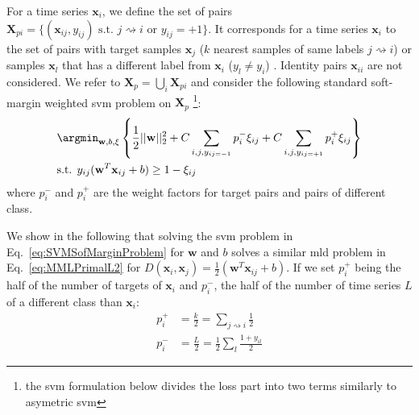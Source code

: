 For a time series $\textbf{x}_i$, we define the set of pairs $\textbf{X}_{pi}=\{(\textbf{x}_{ij},y_{ij}) \text{ s.t. } j\rightsquigarrow i \text{ or } y_{ij}=+1\}$. It corresponds for a time series $\textbf{x}_i$ to the set of pairs with target samples $\textbf{x}_j$ ($k$ nearest samples of same labels $j\rightsquigarrow i$) or samples $\textbf{x}_l$ that has a different label from $\textbf{x}_i$ ($y_l \neq y_i$) . Identity pairs $\textbf{x}_{ii}$ are not considered. We refer to $\textbf{X}_{p}=\bigcup\limits_{i} \textbf{X}_{pi}$ and consider the following standard soft-margin weighted {\sc svm} problem on $\textbf{X}_p$ \footnote{the {\sc svm} formulation below divides the loss part into two terms similarly to asymetric {\sc svm}}: 
\begin{equation}
\begin{aligned}
&\displaystyle \argmin_{\textbf{w},b,\xi} 
\left\lbrace \frac{1}{2}||\textbf{w}||_2^2
+ C \sum\limits_{i,j,y_{ij=-1}}p_i^-\xi_{ij}
+ C \sum\limits_{i,j, y_{ij=+1}}p_i^+\xi_{ij} \right\rbrace \\
& \text{s.t.  }  y_{ij}(\textbf{w}^T\textbf{x}_{ij}+b) \geq 1-\xi_{ij}
\end{aligned}
\label{eq:SVMSofMarginProblem}
\end{equation}
\noindent where $p_i^-$ and $p_i^+$ are the weight factors for target pairs and pairs of different class.

\noindent  We show in the following that solving the {\sc svm} problem in Eq.~\ref{eq:SVMSofMarginProblem} for $\textbf{w}$ and $b$ solves a similar {\sc mld} problem in Eq.~\ref{eq:MMLPrimalL2} for $D(\textbf{x}_i,\textbf{x}_j)=\frac{1}{2}(\textbf{w}^T\textbf{x}_{ij}+b)$. If we set $p_i^+$ being the half of the number of targets of $\textbf{x}_i$ and $p_i^-$, the half of the number of time series $L$ of a different class than $\textbf{x}_i$:
\begin{align}
p_i^+ &= \frac{k}{2} = \sum_{j \rightsquigarrow i} \frac{1}{2} \label{eq:pi_plus}\\
p_i^- &= \frac{L}{2} = \frac{1}{2}\sum_l \frac{1+y_{il}}{2} \label{eq:pi_moins}
\end{align}

